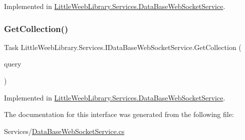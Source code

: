Implemented in \mbox{\hyperlink{class_little_weeb_library_1_1_services_1_1_data_base_web_socket_service_a5d9baf510f46f6a3fac9fe84325bb017}{Little\+Weeb\+Library.\+Services.\+Data\+Base\+Web\+Socket\+Service}}.

\mbox{\label{interface_little_weeb_library_1_1_services_1_1_i_data_base_web_socket_service_aeeeecbdfb73e0242a2d36f8d1d88b6ee}} 
\subsubsection{\texorpdfstring{Get\+Collection()}{GetCollection()}}
{\footnotesize\ttfamily Task Little\+Weeb\+Library.\+Services.\+I\+Data\+Base\+Web\+Socket\+Service.\+Get\+Collection (\begin{DoxyParamCaption}\item[{J\+Object}]{query }\end{DoxyParamCaption})}



Implemented in \mbox{\hyperlink{class_little_weeb_library_1_1_services_1_1_data_base_web_socket_service_aef8bdd650778c72d639f1e89c1d6dcad}{Little\+Weeb\+Library.\+Services.\+Data\+Base\+Web\+Socket\+Service}}.



The documentation for this interface was generated from the following file\+:\begin{DoxyCompactItemize}
\item 
Services/\mbox{\hyperlink{_data_base_web_socket_service_8cs}{Data\+Base\+Web\+Socket\+Service.\+cs}}\end{DoxyCompactItemize}
